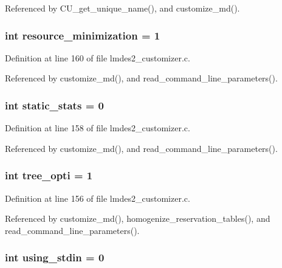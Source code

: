 Referenced by CU\_\-get\_\-unique\_\-name(), and customize\_\-md().
\subsubsection{\setlength{\rightskip}{0pt plus 5cm}int \bf{resource\_\-minimization} = 1}\label{lmdes2__customizer_8c_138a3fb2763ae65b4e1a58716ed69355}




Definition at line 160 of file lmdes2\_\-customizer.c.

Referenced by customize\_\-md(), and read\_\-command\_\-line\_\-parameters().
\subsubsection{\setlength{\rightskip}{0pt plus 5cm}int \bf{static\_\-stats} = 0}\label{lmdes2__customizer_8c_0464ae67d9a81d2af58909687534f835}




Definition at line 158 of file lmdes2\_\-customizer.c.

Referenced by customize\_\-md(), and read\_\-command\_\-line\_\-parameters().
\subsubsection{\setlength{\rightskip}{0pt plus 5cm}int \bf{tree\_\-opti} = 1}\label{lmdes2__customizer_8c_b8dfd5ac67573c68c04e14078ea2aeee}




Definition at line 156 of file lmdes2\_\-customizer.c.

Referenced by customize\_\-md(), homogenize\_\-reservation\_\-tables(), and read\_\-command\_\-line\_\-parameters().
\subsubsection{\setlength{\rightskip}{0pt plus 5cm}int \bf{using\_\-stdin} = 0}\label{lmdes2__customizer_8c_bc340a0cfa46e3f25a4d1adab28331c0}




